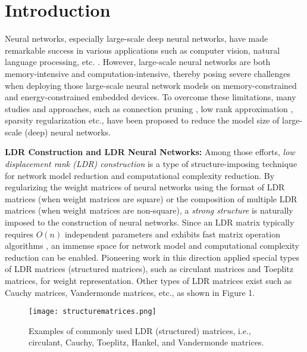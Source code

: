 \documentclass{article}
\begin{document}




\section{Introduction}\label{sintro}
Neural networks, especially large-scale deep neural networks, have made remarkable success in various applications such as computer vision, natural language processing, etc. \cite{krizhevsky2012imagenet}\cite{sutskever2014sequence}. However, large-scale neural networks are both memory-intensive and computation-intensive, thereby posing severe challenges when deploying those large-scale neural network models on memory-constrained and energy-constrained embedded devices. To overcome these limitations, many studies and approaches, such as connection pruning \cite{han2015deep}\cite{gong2014compressing}, low rank approximation \cite{denton2014exploiting}\cite{jaderberg2014speeding}, sparsity regularization \cite{wen2016learning}\cite{liu2015sparse} etc., have been proposed to reduce the model size of large-scale (deep) neural networks.

\textbf{LDR Construction and LDR Neural Networks:} Among those efforts, \emph{low displacement rank (LDR) construction} is a type of structure-imposing technique for network model reduction and computational complexity reduction. By regularizing the weight matrices of neural networks using the format of LDR matrices (when weight matrices are square) or the composition of multiple LDR matrices (when weight matrices are non-square), a \emph{strong structure} is naturally imposed to the construction of neural networks. Since an LDR matrix typically requires $O(n)$ independent parameters and exhibits fast matrix operation algorithms \cite{bini2012polynomial}, an immense space for network model and computational complexity reduction can be enabled. Pioneering work in this direction \cite{cheng2015exploration}\cite{sindhwani2015structured} applied special types of LDR matrices (structured matrices), such as circulant matrices and Toeplitz matrices, for weight representation. Other types of LDR matrices exist such as Cauchy matrices, Vandermonde matrices, etc., as shown in Figure 1.%
\begin{figure}
\label{fstr}
\centering
\texttt{[image: structurematrices.png]}
\caption{Examples of commonly used LDR (structured) matrices, i.e.,
circulant, Cauchy, Toeplitz, Hankel, and Vandermonde matrices.
}
\end{figure}
\end{document}

